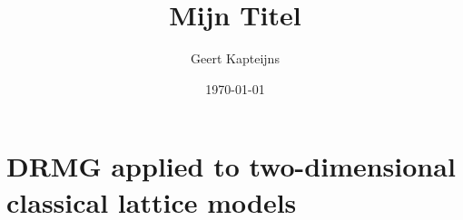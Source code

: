 \documentclass[9pt, ebook, openany, oneside]{memoir}
\renewcommand{\afterchaptertitle}{%
 \vskip2em
 \hrule height 0.6pt
 \vskip2em
 }
\begin{document}
\pagestyle{simple}



\frontmatter

\title{Mijn Titel}
\author{Geert Kapteijns}
\date{\today}


\begingroup
\renewcommand{\afterchaptertitle}{\vskip1.5em}

\tableofcontents*
\endgroup

\mainmatter

% 

% 

\chapter{DRMG applied to two-dimensional classical lattice models}


% 



% 
%
% 



\backmatter
\printbibliography
\end{document}
